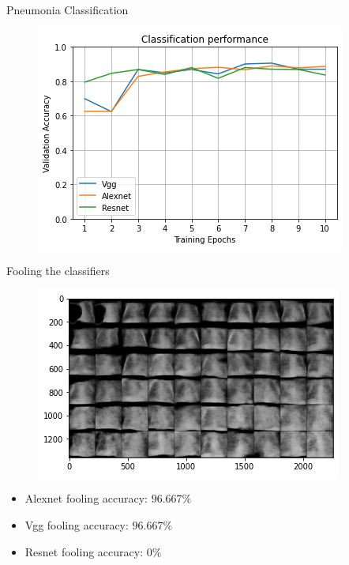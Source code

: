 \begin{frame}{Pneumonia Classification}
    \begin{figure}
        \centering
        \includegraphics[width=.9\textwidth]{Images/classification_performance.png}
    \end{figure}
\end{frame}

\begin{frame}{Fooling the classifiers}
    \begin{figure}
        \centering
        \includegraphics[width=.7\textwidth]{Images/xray_test_example.png}
    \end{figure}
    \begin{itemize}
        \item Alexnet fooling accuracy: $96.667\%$
        \item Vgg fooling accuracy: $96.667\%$
        \item Resnet fooling accuracy: $0\%$
    \end{itemize}
\end{frame}

